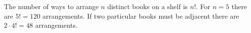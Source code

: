 The number of ways to arrange $n$ distinct books on a shelf is $n!$.
For $n = 5$ there are $5! = 120$ arrangements.
If two particular books must be adjacent there are $2 \cdot 4! = 48$ arrangements.
